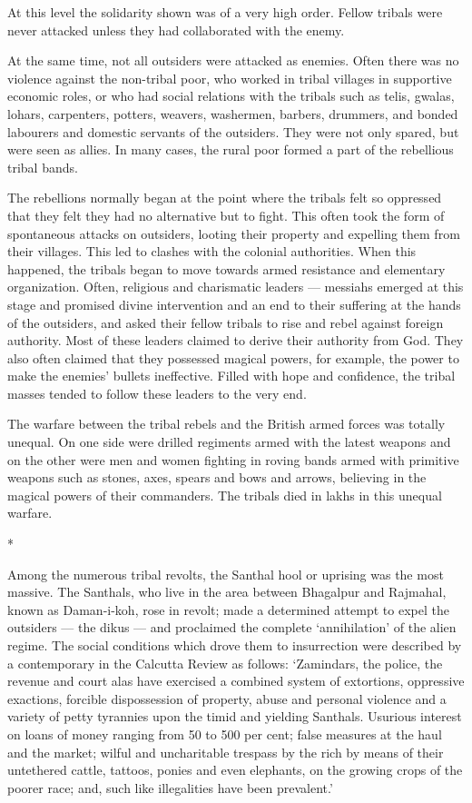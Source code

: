 At this level the solidarity shown was of a very high order. Fellow tribals were never attacked unless they had collaborated with the enemy.

At the same time, not all outsiders were attacked as enemies. Often there was no violence against the non-tribal poor, who worked in tribal villages in supportive economic roles, or who had social relations with the tribals such as telis, gwalas, lohars, carpenters, potters, weavers, washermen, barbers, drummers, and bonded labourers and domestic servants of the outsiders. They were not only spared, but were seen as allies. In many cases, the rural poor formed a part of the rebellious tribal bands.

The rebellions normally began at the point where the tribals felt so oppressed that they felt they had no alternative but to fight. This often took the form of spontaneous attacks on outsiders, looting their property and expelling them from their villages. This led to clashes with the colonial authorities. When this happened, the tribals began to move towards armed resistance and elementary organization. Often, religious and charismatic leaders — messiahs emerged at this stage and promised divine intervention and an end to their suffering at the hands of the outsiders, and asked their fellow tribals to rise and rebel against foreign authority. Most of these leaders claimed to derive their authority from God. They also often claimed that they possessed magical powers, for example, the power to make the enemies’ bullets ineffective. Filled with hope and confidence, the tribal masses tended to follow these leaders to the very end.

The warfare between the tribal rebels and the British armed forces was totally unequal. On one side were drilled regiments armed with the latest weapons and on the other were men and women fighting in roving bands armed with primitive weapons such as stones, axes, spears and bows and arrows, believing in the magical powers of their commanders. The tribals died in lakhs in this unequal warfare.

\begin{center}*\end{center}

Among the numerous tribal revolts, the Santhal hool or uprising was the most massive. The Santhals, who live in the area between Bhagalpur and Rajmahal, known as Daman-i-koh, rose in revolt; made a determined attempt to expel the outsiders — the dikus — and proclaimed the complete ‘annihilation’ of the alien regime. The social conditions which drove them to insurrection were described by a contemporary in the Calcutta Review as follows: ‘Zamindars, the police, the revenue and court alas have exercised a combined system of extortions, oppressive exactions, forcible dispossession of property, abuse and personal violence and a variety of petty tyrannies upon the timid and yielding Santhals. Usurious interest on loans of money ranging from 50 to 500 per cent; false measures at the haul and the market; wilful and uncharitable trespass by the rich by means of their untethered cattle, tattoos, ponies and even elephants, on the growing crops of the poorer race; and, such like illegalities have been prevalent.’

